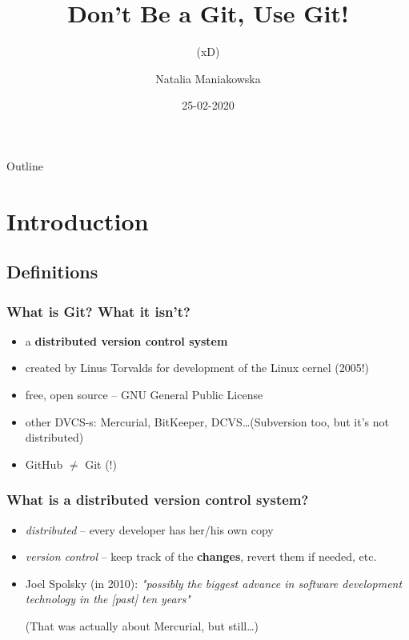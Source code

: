\documentclass{beamer}
\title{Don't Be a Git, Use Git!}
\subtitle{\tiny{(xD)}}
\author{Natalia Maniakowska}
\institute{skygate}
\date{25-02-2020}
\begin{document}
    \frame{\titlepage}

    \begin{frame}{Outline}
        \tableofcontents
    \end{frame}


    \section{Introduction}


    \subsection{Definitions}

    \begin{frame}
        \frametitle{What is Git? What it isn't?}
        \begin{itemize}
            \item a \textbf{distributed version control system}
            \item created by Linus Torvalds for development of the Linux cernel (2005!)
            \item free, open source -- GNU General Public License
            \item other DVCS-s: Mercurial, BitKeeper, DCVS\dots (Subversion too, but it's not distributed)
            \item GitHub $\neq$ Git (!)
        \end{itemize}

    \end{frame}

    \begin{frame}
        \frametitle{What is a distributed version control system?}
        \begin{itemize}
            \item \textit{distributed} -- every developer has her/his own copy
            \item \textit{version control} -- keep track of the \textbf{changes}, revert them if needed, etc.
            \item Joel Spolsky (in 2010): \emph{"possibly the biggest advance in software development technology in the [past] ten years"}

            \footnotesize (That was actually about Mercurial, but still\dots)
        \end{itemize}

    \end{frame}
\end{document}

